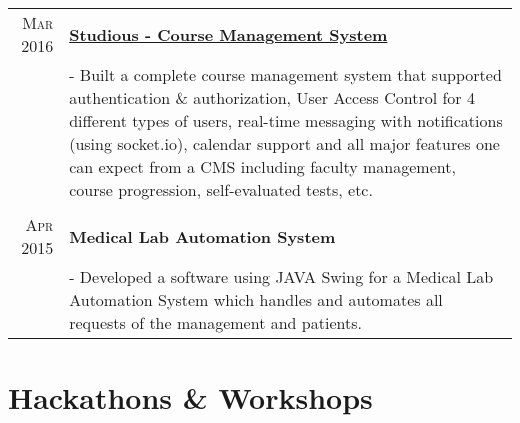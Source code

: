\documentclass[a4paper,10pt]{extarticle} %
\begin{document}
\begin{tabular}{r|p{17cm}}
\textsc{Mar 2016} & \textbf{\href{http://ghostwriternr.me/dbmsass3/}{Studious - Course Management System}}\\
& \footnotesize{- Built a complete course management system that supported authentication \& authorization, User Access Control for 4 different types of users, real-time messaging with notifications (using socket.io), calendar support and all major features one can expect from a CMS including faculty management, course progression, self-evaluated tests, etc.}\\
\multicolumn{2}{c}{} \\

\textsc{Apr 2015} & \textbf{Medical Lab Automation System}\\
& \footnotesize{- Developed a software using JAVA Swing for a Medical Lab Automation System which handles and automates all requests of the management and patients.}
\end{tabular}

\section{Hackathons \& Workshops}
\end{document}
